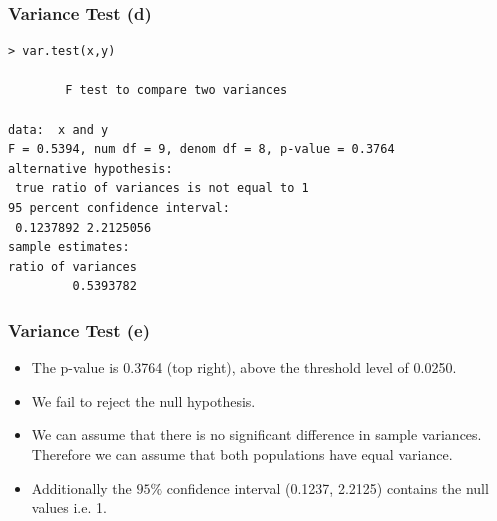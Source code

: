 \documentclass[a4]{beamer}
\begin{document}
\begin{frame}[fragile]
\frametitle{Variance Test (d)}
\begin{verbatim}
> var.test(x,y)

        F test to compare two variances

data:  x and y
F = 0.5394, num df = 9, denom df = 8, p-value = 0.3764
alternative hypothesis: 
 true ratio of variances is not equal to 1
95 percent confidence interval:
 0.1237892 2.2125056
sample estimates:
ratio of variances
         0.5393782
\end{verbatim}

\end{frame}

\begin{frame}
\frametitle{Variance Test (e)}
\begin{itemize}
\item The p-value is 0.3764 (top right), above the threshold level of 0.0250.
\item We fail to reject the null hypothesis.
\item We can assume that there is no significant difference in sample variances. Therefore we can assume that both populations have equal variance.
\item Additionally the $95\%$ confidence interval (0.1237, 2.2125) contains the null values i.e. 1.
\end{itemize}
\end{frame}


\end{document}
